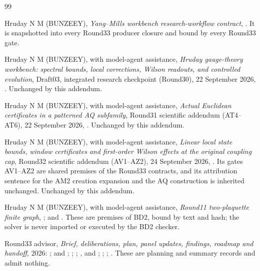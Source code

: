 \begin{thebibliography}{99}
\small\raggedright

Hruday N M (BUNZEEY),
\emph{Yang--Mills workbench research-workflow contract},
.
It is snapshotted into every Round33 producer closure and bound by every
Round33 gate.

Hruday N M (BUNZEEY), with model-agent assistance,
\emph{Hruday gauge-theory workbench: spectral bounds, local corrections,
Wilson readouts, and controlled evolution}, Draft03, integrated research
checkpoint (Round30), 22 September 2026,
.
Unchanged by this addendum.

Hruday N M (BUNZEEY), with model-agent assistance,
\emph{Actual Euclidean certificates in a patterned AQ subfamily}, Round31
scientific addendum (AT4--AT6), 22 September 2026,
.
Unchanged by this addendum.

Hruday N M (BUNZEEY), with model-agent assistance,
\emph{Linear local state bounds, window certificates and first-order Wilson
effects at the original coupling cap}, Round32 scientific addendum
(AV1--AZ2), 24 September 2026,
.
Its gates AV1--AZ2 are shared premises of the Round33 contracts, and its
attribution sentence for the AM2 creation expansion and the AQ construction is
inherited unchanged. Unchanged by this addendum.

Hruday N M (BUNZEEY), with model-agent assistance,
\emph{Round11 two-plaquette finite graph},
;
 and
.
These are premises of BD2, bound by text and hash; the solver is never
imported or executed by the BD2 checker.

Round33 advisor,
\emph{Brief, deliberations, plan, panel updates, findings, roadmap and
handoff}, 2026:
;
 and
;
;
;
,
 and
;
;
;
.
These are planning and summary records and admit nothing.


\end{thebibliography}
